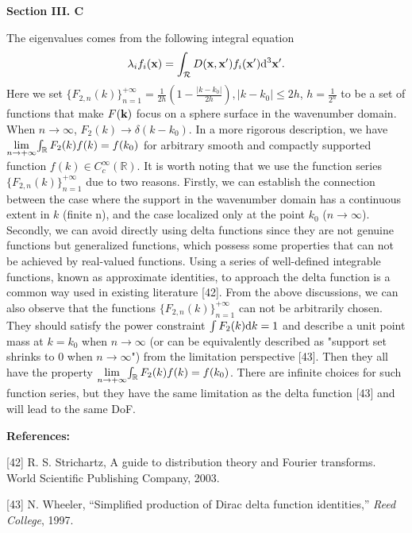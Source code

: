 \documentclass[a4paper,12pt]{article}
\begin{document}
\begin{framed}
	{\bf Section III. C}

The eigenvalues comes from the following integral equation
\begin{equation}
	\lambda_i f_i({\bf x}) = \int_{\mathcal{R}}D({\bf x},{\bf x}')f_i({\bf x}'){\rm d}^3{\bf x}'.
	\label{eigenfunction_3d}
\end{equation}
Here we set $\{F_{2,n}(k)\}_{n=1}^{+\infty} = \frac{1}{2h}\left( 1-\frac{|k-k_0|}{2h} \right), |k-k_0|\leqslant 2h$, $h = \frac{1}{2^n}$ to be a set of functions that make $F({\bf k})$ focus on a sphere surface in the wavenumber domain. When $n \rightarrow \infty$, $F_2(k) \rightarrow \delta(k-k_0)$. {\color{red} In a more rigorous description, we have $\underset{n \rightarrow +\infty}{\rm lim}{\int_{\mathbb{R}} F_2(k)f(k) } = f(k_0)$ for arbitrary smooth and compactly supported function $f(k) \in C_c^{\infty}({\mathbb R})$. It is worth noting that we use the function series $\{F_{2,n}(k)\}_{n=1}^{+\infty}$ due to two reasons. Firstly, we can establish the connection between the case where the support in the wavenumber domain has a continuous extent in $k$ (finite n), and the case localized only at the point $k_0$ ($n \rightarrow \infty$). Secondly, we can avoid directly using delta functions since they are not genuine functions but generalized functions, which possess some properties that can not be achieved by real-valued functions. Using a series of well-defined integrable functions, known as approximate identities, to approach the delta function is a common way used in existing literature [42]. From the above discussions, we can also observe that the functions $\{F_{2,n}(k)\}_{n=1}^{+\infty}$ can not be arbitrarily chosen. They should satisfy the power constraint $\int F_2(k) {\rm d}k = 1$ and describe a unit point mass at $k = k_0$ when $n \rightarrow \infty$ (or can be equivalently described as "support set shrinks to 0 when $n \rightarrow \infty$")
	from the limitation perspective
	[43]. 
	Then they all have the property $\underset{n \rightarrow +\infty}{\rm lim}{\int_{\mathbb{R}} F_2(k)f(k) } = f(k_0)$. There are infinite choices for such function series, but they have the same limitation as the delta function [43] and will lead to the same DoF.} 
\end{framed}
 
 {\color{blue}
 	{\bf References:}
 	
 	[42] R. S. Strichartz, A guide to distribution theory and Fourier transforms. World Scientific Publishing Company, 2003.
 	
 	[43] N. Wheeler, “Simplified production of Dirac delta function identities,” {\it Reed College}, 1997.
 }
 
\end{document}
